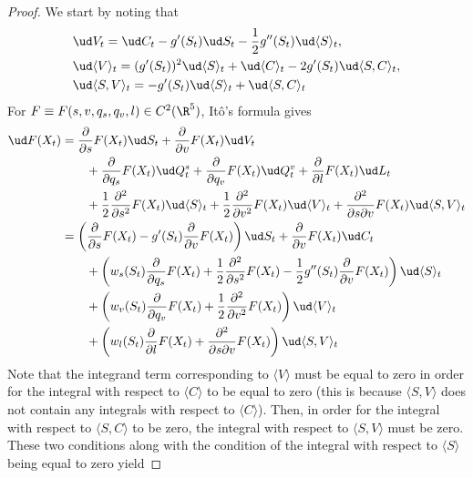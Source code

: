 \documentclass[11pt]{article}
\begin{document}
\begin{proof}

We start by noting that 
\begin{align*}
&\ud V_t = \ud C_t - g^\prime(S_t) \ud S_t - \frac{1}{2} g^{\prime\prime}(S_t) \ud \langle S \rangle_t, \\
%
%
%
&\ud \langle V \rangle_t = (g^\prime (S_t))^2 \ud \langle S \rangle_t + \ud \langle C \rangle_t - 2 g^\prime(S_t) \ud \langle S, C \rangle_t, \\
%
%
%
&\ud \langle S, V \rangle_t = - g^\prime(S_t) \ud \langle S \rangle_t + \ud \langle S, C \rangle_t
\end{align*}
For $F \equiv F(s,v,q_s, q_v, l) \in C^2(\R^5)$, It\^o's formula gives
\begin{align*}
\ud F(X_t) &= \frac{\partial}{\partial s} F(X_t) \ud S_t + \frac{\partial}{\partial v} F(X_t) \ud V_t \\
& \qquad + \frac{\partial}{\partial q_s} F(X_t) \ud Q^s_t + \frac{\partial}{\partial q_v} F(X_t) \ud Q^v_t + \frac{\partial}{\partial l} F(X_t) \ud L_t \\
& \qquad + \frac{1}{2} \frac{\partial^2}{\partial s^2} F(X_t) \ud \langle S \rangle_t + \frac{1}{2} \frac{\partial^2}{\partial v^2} F(X_t) \ud \langle V \rangle_t + \frac{\partial^2}{\partial s \partial v} F(X_t) \ud \langle S, V \rangle_t \\
%
%
%
&= \left( \frac{\partial}{\partial s} F(X_t) - g^\prime(S_t) \frac{\partial}{\partial v} F(X_t) \right) \ud S_t + \frac{\partial}{\partial v} F(X_t) \ud C_t \\
& \qquad + \left( w_s(S_t) \frac{\partial}{\partial q_s} F(X_t) + \frac{1}{2} \frac{\partial^2}{\partial s^2} F(X_t) - \frac{1}{2} g^{\prime\prime}(S_t) \frac{\partial}{\partial v} F(X_t) \right) \ud \langle S \rangle_t \\
& \qquad + \left( w_v(S_t) \frac{\partial}{\partial q_v} F(X_t) + \frac{1}{2} \frac{\partial^2}{\partial v^2}F(X_t) \right) \ud \langle V \rangle_t \\
&\qquad + \left( w_l(S_t) \frac{\partial}{\partial l} F(X_t) + \frac{\partial^2}{\partial s \partial v}F(X_t) \right) \ud \langle S, V \rangle_t
\end{align*}
Note that the integrand term corresponding to $\langle V \rangle$ must be equal to zero in order for the integral with respect to $\langle C \rangle$ to be equal to zero (this is because $\langle S, V \rangle$ does not contain any integrals with respect to $\langle C \rangle$). Then, in order for the integral with respect to $\langle S, C \rangle$ to be zero, the integral with respect to $\langle S, V \rangle$ must be zero. These two conditions along with the condition of the integral with respect to $\langle S \rangle$ being equal to zero yield

\end{proof}
\end{document}
